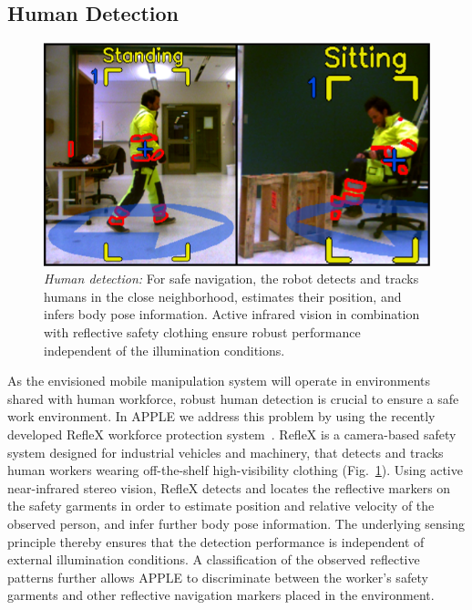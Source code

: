 \subsection{Human Detection}
\label{subsec:people_det}
%
\begin{figure}[t!]
  \begin{center}
    \includegraphics[width =1\linewidth]{figs/person_detection}
    \caption{\textit{Human detection:} For safe navigation, the robot detects and tracks humans in the close neighborhood, estimates their position, and infers body pose information. Active infrared vision in combination with reflective safety clothing ensure robust performance independent of the illumination conditions.}
    \label{fig:people_det}
    \vspace{-0.5cm}
  \end{center}
\end{figure}
% 
As the envisioned mobile manipulation system will operate in environments shared with human workforce,
robust human detection is crucial to ensure a safe work environment. In APPLE we address this problem by using the recently developed RefleX workforce protection system~\cite{Mosb14}. RefleX is a camera-based safety system designed for industrial vehicles and machinery, that detects and tracks human workers wearing off-the-shelf high-visibility clothing (Fig.~\ref{fig:people_det}). Using active near-infrared stereo vision, RefleX detects and locates the reflective markers on the safety garments in order to estimate position and relative velocity of the observed person, and infer further body pose information. The underlying sensing principle thereby ensures that the detection performance is independent of external illumination conditions. A classification of the observed reflective patterns further allows APPLE to discriminate between the worker's safety garments and other reflective navigation markers placed in the environment.
